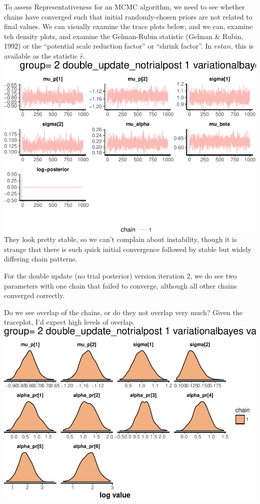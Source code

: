 \documentclass[]{article}
\begin{document}
To assess Representativeness for an MCMC algorithm, we need to see
whether chains have converged such that initial randomly-chosen priors
are not related to final values. We can visually examine the trace plots
below, and we can, examine teh density plots, and examine the
Gelman-Rubin statistic (Gelman \& Rubin, 1992) or the ``potential scale
reduction factor'' or ``shrink factor''. In \(rstan\), this is available
as the statistic \(\widehat{r}\).
\includegraphics{compare_vb_and_MCMC_doubleUpdateOnly_files/figure-latex/StanTracePlot-1.pdf}
They look pretty stable, so we can't complain about instability, though
it is strange that there is such quick initial convergence followed by
stable but widely differing chain patterns.

For the double update (no trial posterior) version iteration 2, we do
see two parameters with one chain that failed to converge, although all
other chains converged correctly.

Do we see overlap of the chains, or do they not overlap very much? Given
the traceplot, I'd expect high levels of overlap.
\includegraphics{compare_vb_and_MCMC_doubleUpdateOnly_files/figure-latex/StanPlotDensity-1.pdf}
\end{document}
